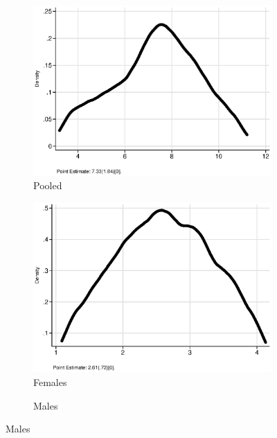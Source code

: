 \begin{figure}
\centering
\caption{Benefit/Cost Ratios by Gender}\label{figure:ratiodist}
\begin{subfigure}[h]{0.35\textwidth}
		\centering
		\caption{Pooled}
		\includegraphics[width=\textwidth]{output/ratios_2_sexp.eps}
\end{subfigure}%
\begin{subfigure}[h]{0.35\textwidth}
	\centering
	\caption{Females}
		\includegraphics[width=\textwidth]{output/ratios_2_sexf.eps}
\end{subfigure}%
\begin{subfigure}[h]{0.35\textwidth}
		\centering
		\caption{Males}

\end{subfigure}
\end{figure}
